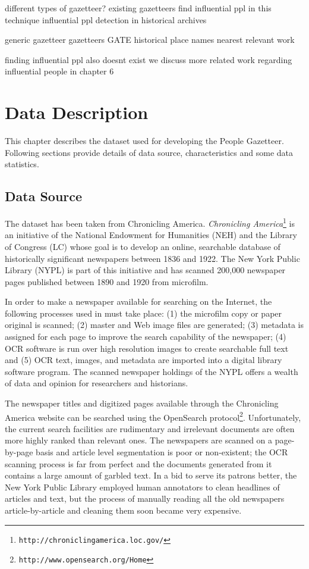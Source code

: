 \documentclass[letterpaper,11pt]{report}
\begin{document}
different types of gazetteer?
existing gazetteers
find influential ppl in this technique
influential ppl detection in historical archives

generic gazetteer
gazetteers GATE 
historical place names 
nearest relevant work 

finding influential ppl also doesnt exist 
we discuss more related work regarding influential people in chapter 6






\chapter{Data Description}
\label{chapter:data description}

This chapter describes the dataset used for developing the People Gazetteer. Following sections provide details of data source, characteristics and some data statistics.

\section{Data Source} 

The dataset has been taken from Chronicling America.
\noindent \emph{Chronicling
America}\footnote{\texttt{http://chroniclingamerica.loc.gov/}} is an
initiative of the National Endowment for Humanities (NEH) and the
Library of Congress (LC) whose goal is to develop an online,
searchable database of historically significant newspapers between
1836 and 1922. The New York Public Library (NYPL) is part of this
initiative and has scanned 200,000 newspaper pages published between
1890 and 1920 from microfilm.

In order to make a newspaper available for searching on the Internet,
the following processes used in \cite{dutta2011learning} must take place: (1) the microfilm copy or
paper original is scanned; (2) master and Web image files are
generated; (3) metadata is assigned for each page to improve the
search capability of the newspaper; (4) OCR software is run over high
resolution images to create searchable full text and (5) OCR text,
images, and metadata are imported into a digital library software
program. The scanned newspaper holdings of the NYPL offers a wealth of
data and opinion for researchers and historians.

The newspaper titles and digitized pages available through the
Chronicling America website can be searched using the OpenSearch
protocol\footnote{\texttt{http://www.opensearch.org/Home}}.
Unfortunately, the current search facilities are rudimentary and
irrelevant documents are often more highly ranked than relevant ones.
The newspapers are scanned on a page-by-page basis and article level
segmentation is poor or non-existent; the OCR scanning process is far
from perfect and the documents generated from it contains a large
amount of garbled text. In a bid to serve its patrons better, the New
York Public Library employed human annotators to clean headlines of
articles and text, but the process of manually reading all the old
newspapers article-by-article and cleaning them soon became very
expensive. 
\end{document}
